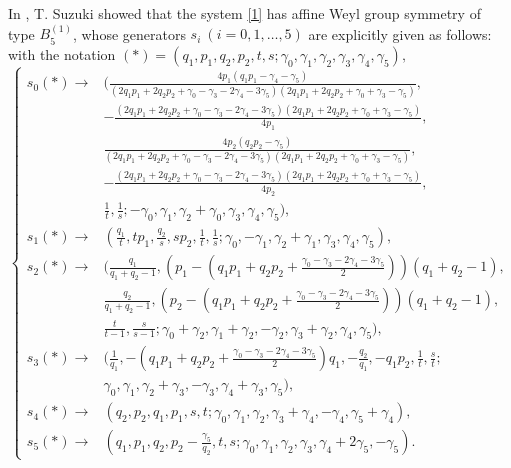 In \cite{S}, T. Suzuki showed that the system \eqref{1} has affine Weyl group symmetry of type $B_5^{(1)}$, whose generators $s_i \ (i=0,1,\dots,5)$ are explicitly given as follows: with the notation $(*)=(q_1,p_1,q_2,p_2,t,s;\gamma_0,\gamma_1,\gamma_2,\gamma_3,\gamma_4,\gamma_5),$
\begin{equation}\label{T.Suzuki}
  \left\{
  \begin{aligned}
   s_0 (*) \rightarrow &(\frac{4p_1(q_1p_1-\gamma_4-\gamma_5)}{(2q_1p_1+2q_2p_2+\gamma_0-\gamma_3-2\gamma_4-3\gamma_5)(2q_1p_1+2q_2p_2+\gamma_0+\gamma_3-\gamma_5)},\\
        &-\frac{(2q_1p_1+2q_2p_2+\gamma_0-\gamma_3-2\gamma_4-3\gamma_5)(2q_1p_1+2q_2p_2+\gamma_0+\gamma_3-\gamma_5)}{4p_1},\\
        &\frac{4p_2(q_2p_2-\gamma_5)}{(2q_1p_1+2q_2p_2+\gamma_0-\gamma_3-2\gamma_4-3\gamma_5)(2q_1p_1+2q_2p_2+\gamma_0+\gamma_3-\gamma_5)},\\
        &-\frac{(2q_1p_1+2q_2p_2+\gamma_0-\gamma_3-2\gamma_4-3\gamma_5)(2q_1p_1+2q_2p_2+\gamma_0+\gamma_3-\gamma_5)}{4p_2},\\
        &\frac{1}{t},\frac{1}{s};-\gamma_0,\gamma_1,\gamma_2+\gamma_0,\gamma_3,\gamma_4,\gamma_5),\\
        s_1 (*) \rightarrow &(\frac{q_1}{t},tp_1,\frac{q_2}{s},sp_2,\frac{1}{t},\frac{1}{s};\gamma_0,-\gamma_1,\gamma_2+\gamma_1,\gamma_3,\gamma_4,\gamma_5),\\
s_2 (*) \rightarrow &(\frac{q_1}{q_1+q_2-1},\left(p_1-(q_1p_1+q_2p_2+\frac{\gamma_0-\gamma_3-2\gamma_4-3\gamma_5}{2})\right)(q_1+q_2-1),\\
&\frac{q_2}{q_1+q_2-1},\left(p_2-(q_1p_1+q_2p_2+\frac{\gamma_0-\gamma_3-2\gamma_4-3\gamma_5}{2})\right)(q_1+q_2-1),\\
&\frac{t}{t-1},\frac{s}{s-1};\gamma_0+\gamma_2,\gamma_1+\gamma_2,-\gamma_2,\gamma_3+\gamma_2,\gamma_4,\gamma_5),\\
s_3 (*) \rightarrow &(\frac{1}{q_1},-(q_1p_1+q_2p_2+\frac{\gamma_0-\gamma_3-2\gamma_4-3\gamma_5}{2})q_1,-\frac{q_2}{q_1},-q_1p_2,\frac{1}{t},\frac{s}{t};\\
&\gamma_0,\gamma_1,\gamma_2+\gamma_3,-\gamma_3,\gamma_4+\gamma_3,\gamma_5),\\
s_4 (*) \rightarrow &(q_2,p_2,q_1,p_1,s,t;\gamma_0,\gamma_1,\gamma_2,\gamma_3+\gamma_4,-\gamma_4,\gamma_5+\gamma_4),\\
s_5 (*) \rightarrow &(q_1,p_1,q_2,p_2-\frac{\gamma_5}{q_2},t,s;\gamma_0,\gamma_1,\gamma_2,\gamma_3,\gamma_4+2\gamma_5,-\gamma_5).
   \end{aligned}
  \right. 
\end{equation}

